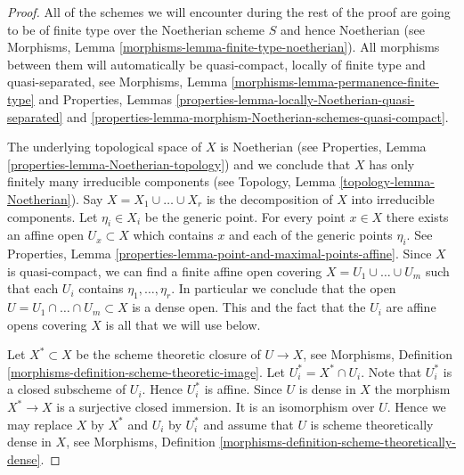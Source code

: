 \begin{proof}
All of the schemes we will encounter during the rest of the proof
are going to be of finite type over the Noetherian scheme $S$ and
hence Noetherian
(see Morphisms, Lemma \ref{morphisms-lemma-finite-type-noetherian}).
All morphisms between them will automatically be quasi-compact, locally of
finite type and quasi-separated, see
Morphisms, Lemma \ref{morphisms-lemma-permanence-finite-type} and
Properties,
Lemmas \ref{properties-lemma-locally-Noetherian-quasi-separated} and
\ref{properties-lemma-morphism-Noetherian-schemes-quasi-compact}.

\medskip\noindent
The underlying topological space of $X$ is Noetherian
(see Properties, Lemma \ref{properties-lemma-Noetherian-topology})
and we conclude that $X$ has only finitely many irreducible components
(see Topology, Lemma \ref{topology-lemma-Noetherian}).
Say $X = X_1 \cup \ldots \cup X_r$ is the decomposition
of $X$ into irreducible components.
Let $\eta_i \in X_i$ be the generic point.
For every point $x \in X$ there exists an affine open
$U_x \subset X$ which contains $x$ and each of the generic
points $\eta_i$. See
Properties, Lemma \ref{properties-lemma-point-and-maximal-points-affine}.
Since $X$ is quasi-compact, we can find a finite affine open
covering $X = U_1 \cup \ldots \cup U_m$ such that
each $U_i$ contains $\eta_1, \ldots, \eta_r$.
In particular we conclude that the open
$U = U_1 \cap \ldots \cap U_m \subset X$ is
a dense open. This and the fact that the $U_i$ are affine opens
covering $X$ is all that we will use below.

\medskip\noindent
Let $X^* \subset X$ be the scheme theoretic closure of $U \to X$, see
Morphisms, Definition \ref{morphisms-definition-scheme-theoretic-image}.
Let $U_i^* = X^* \cap U_i$. Note that $U_i^*$ is a closed subscheme
of $U_i$. Hence $U_i^*$ is affine. Since $U$ is dense in $X$ the
morphism $X^* \to X$ is a surjective closed immersion. It is an
isomorphism over $U$. Hence we may replace $X$ by $X^*$ and
$U_i$ by $U_i^*$ and assume that $U$ is scheme theoretically dense
in $X$, see
Morphisms, Definition \ref{morphisms-definition-scheme-theoretically-dense}.


\end{proof}
